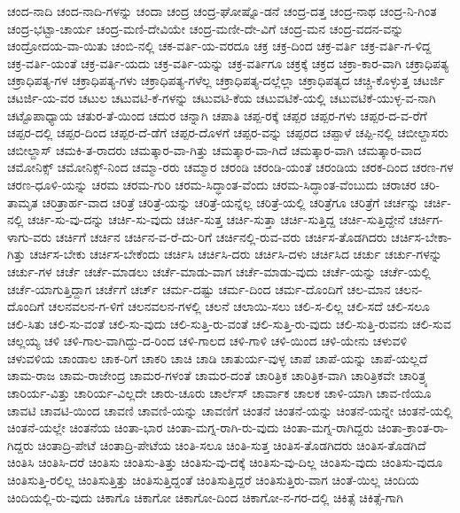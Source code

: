 {ಚಂದ-ನಾದಿ
ಚಂದ-ನಾದಿ-ಗಳನ್ನು
ಚಂದಾ
ಚಂದ್ರ
ಚಂದ್ರ-ಘೋಷ್ನೊ-ಡನೆ
ಚಂದ್ರ-ದತ್ತ
ಚಂದ್ರ-ನಾಥ
ಚಂದ್ರ-ನಿ-ಗಿಂತ
ಚಂದ್ರ-ಭಟ್ಟಾ-ಚಾರ್ಯ
ಚಂದ್ರ-ಮಣಿ-ದೇವಿಯೇ
ಚಂದ್ರ-ಮಣೀ-ದೇ-ವಿಗೆ
ಚಂದ್ರ-ಮನ
ಚಂದ್ರ-ವದನ-ವನ್ನು
ಚಂದ್ರೋದಯ-ವಾ-ಯಿತು
ಚಂಬಿ-ನಲ್ಲಿ
ಚಕ-ವರ್ತಿ-ಯ-ವರದೂ
ಚಕ್ರ
ಚಕ್ರ-ದಿಂದ
ಚಕ್ರ-ವರ್ತಿ
ಚಕ್ರ-ವರ್ತಿ-ಗ-ಳಿದ್ದ
ಚಕ್ರ-ವರ್ತಿ-ಯಂತೆ
ಚಕ್ರ-ವರ್ತಿ-ಯದು
ಚಕ್ರ-ವರ್ತಿ-ಯನ್ನು
ಚಕ್ರ-ವರ್ತಿಗೂ
ಚಕ್ರಕ್ಕೆ
ಚಕ್ರದ
ಚಕ್ರಾ-ಕಾರ-ವಾಗಿ
ಚಕ್ರಾಧಿಪತ್ಯ
ಚಕ್ರಾಧಿಪತ್ಯ-ಗಳ
ಚಕ್ರಾಧಿಪತ್ಯ-ಗಳು
ಚಕ್ರಾಧಿಪತ್ಯ-ಗಳೆಲ್ಲ
ಚಕ್ರಾಧಿಪತ್ಯ-ದಲ್ಲೆಲ್ಲಾ
ಚಕ್ರಾಧಿಪತ್ಯದ
ಚಚ್ಚಿ-ಕೊಳ್ಳುತ್ತ
ಚಟರ್ಜಿ
ಚಟರ್ಜಿ-ಯ-ವರ
ಚಟುಲ
ಚಟುವಟಿ-ಕೆ-ಗಳನ್ನು
ಚಟುವಟಿ-ಕೆಯ
ಚಟುವಟಿಕೆ-ಯಲ್ಲಿ
ಚಟುವಟಿಕೆ-ಯುಳ್ಳ-ವ-ನಾಗಿ
ಚಟ್ಟೊಪಾಧ್ಯಾಯ
ಚತುರ-ತೆ-ಯಿಂದ
ಚದುರ
ಚನ್ನಾಗಿ
ಚಪಾತಿ
ಚಪ್ಪ-ರಕ್ಕೆ
ಚಪ್ಪರ
ಚಪ್ಪರ-ಗಳು
ಚಪ್ಪರ-ದ-ವ-ರೆಗೆ
ಚಪ್ಪರ-ದಲ್ಲಿ
ಚಪ್ಪರ-ದಿಂದ
ಚಪ್ಪರ-ದೆ-ಡೆಗೆ
ಚಪ್ಪರ-ದೊಳಗೆ
ಚಪ್ಪರ-ವನ್ನು
ಚಪ್ಪರದ
ಚಪ್ಪಾಳೆ
ಚಪ್ಪಿ-ನಲ್ಲಿ
ಚಬೀಲ್ದಾಸರು
ಚಬೀಲ್ದಾಸ್
ಚಮಕಿ-ತ-ರಾದರು
ಚಮತ್ಕಾರ-ವಾ-ಗಿತ್ತು
ಚಮತ್ಕಾರ-ವಾ-ಗಿದೆ
ಚಮತ್ಕಾರ-ವಾಗಿ
ಚಮತ್ಕಾರ-ವಾದ
ಚಮೋನಿಕ್ಸ್
ಚಮೋನಿಕ್ಸ್-ನಿಂದ
ಚಮ್ಮಾ-ರರು
ಚಮ್ಮಾರ
ಚರಂಡಿ
ಚರಂಡಿ-ಯಂತೆ
ಚರಂಡಿಯ
ಚರಕ-ದಿಂದ
ಚರಣ-ಗಳ
ಚರಣ-ಧೂಳಿ-ಯನ್ನು
ಚರಮ
ಚರಮ-ಗುರಿ
ಚರಮ-ಸಿದ್ಧಾಂತ-ವೆಂದು
ಚರಮ-ಸಿದ್ಧಾಂತ-ವೆಂಬುದು
ಚರಾಚರ
ಚರಿ-ತಾಮೃತ
ಚರಿತ್ರಾರ್ಹ-ವಾದ
ಚರಿತ್ರೆ
ಚರಿತ್ರೆ-ಯನ್ನು
ಚರಿತ್ರೆ-ಯನ್ನೆಲ್ಲ
ಚರಿತ್ರೆ-ಯಲ್ಲಿ
ಚರಿತ್ರೆಗೂ
ಚರಿತ್ರೆಗೆ
ಚರ್ಚನ್ನು
ಚರ್ಚಿ-ನಲ್ಲಿ
ಚರ್ಚಿ-ಸು-ವು-ದನ್ನು
ಚರ್ಚಿ-ಸು-ವುದು
ಚರ್ಚಿ-ಸುತ್ತ
ಚರ್ಚಿ-ಸುತ್ತಾ
ಚರ್ಚಿ-ಸುತ್ತಿದ್ದ
ಚರ್ಚಿ-ಸುತ್ತಿದ್ದೇನೆ
ಚರ್ಚಿಗ-ಳಾಗು-ವರು
ಚರ್ಚಿಗೆ
ಚರ್ಚಿನ
ಚರ್ಚಿನ-ವ-ರೆ-ದು-ರಿಗೆ
ಚರ್ಚಿನಲ್ಲಿ-ರುವ-ವರು
ಚರ್ಚಿಸ-ತೊಡಗಿದರು
ಚರ್ಚಿಸ-ಬೇಕಾ-ಗಿತ್ತು
ಚರ್ಚಿಸ-ಬೇಕು
ಚರ್ಚಿಸ-ಬೇಕೆಂದು
ಚರ್ಚಿಸಿ
ಚರ್ಚಿಸಿ-ದರು
ಚರ್ಚಿಸಿ-ದಳು
ಚರ್ಚಿಸಿದ
ಚರ್ಚು
ಚರ್ಚು-ಗಳನ್ನು
ಚರ್ಚು-ಗಳ
ಚರ್ಚೆ
ಚರ್ಚೆ-ಮಾಡಲು
ಚರ್ಚೆ-ಮಾಡು-ವಾಗ
ಚರ್ಚೆ-ಮಾಡು-ವುದು
ಚರ್ಚೆ-ಯನ್ನು
ಚರ್ಚೆ-ಯಲ್ಲಿ
ಚರ್ಚೆ-ಯಾಗುತ್ತಿದ್ದಾಗ
ಚರ್ಚೆಗೆ
ಚರ್ಚ್
ಚರ್ಮ-ದಷ್ಟು
ಚರ್ಮ-ದಿಂದ
ಚರ್ಮ-ದೊಂದಿಗೆ
ಚಲ-ಮಾನ
ಚಲನ-ದೊಂದಿಗೆ
ಚಲನವಲನ-ಗ-ಳಿಗೆ
ಚಲನವಲನ-ಗಳಲ್ಲಿ
ಚಲನೆ
ಚಲಾಯಿ-ಸಲು
ಚಲಿ-ಸ-ಲಿಲ್ಲ
ಚಲಿ-ಸದೆ
ಚಲಿ-ಸಲೂ
ಚಲಿ-ಸಿತು
ಚಲಿ-ಸು-ವಂತೆ
ಚಲಿ-ಸು-ವುದು
ಚಲಿ-ಸುತ್ತಿ-ರು-ವಂತೆ
ಚಲಿ-ಸುತ್ತಿ-ರು-ವುದು
ಚಲಿ-ಸುತ್ತಿ-ರುವನು
ಚಲಿ-ಸುವ
ಚಲ್ಲಯ್ಯ
ಚಳಿ
ಚಳಿ-ಗಾಲ-ವಾಗಿದ್ದು-ದ-ರಿಂದ
ಚಳಿ-ಗಾಲದ
ಚಳಿ-ಗಾಳಿ
ಚಳಿ-ಯಿಂದ
ಚಳಿ-ಯೇನು
ಚಳುವಳಿ
ಚಳುವಳಿಯ
ಚಾಂಡಾಲ
ಚಾಕ-ರಿಗೆ
ಚಾಕರಿ
ಚಾಚಿ
ಚಾಡಿ
ಚಾತುರ್ಯ-ವುಳ್ಳ
ಚಾಪೆ
ಚಾಪೆ-ಯನ್ನು
ಚಾಪೆ-ಯಲ್ಲದೆ
ಚಾಮ-ರಾಜ
ಚಾಮ-ರಾಜೇಂದ್ರ
ಚಾಮರ-ಗಳಂತೆ
ಚಾಮರ-ದಂತೆ
ಚಾರಿತ್ರಿಕ
ಚಾರಿತ್ರಿಕ-ವಾಗಿ
ಚಾರಿತ್ರಿಕವೇ
ಚಾರಿತ್ರ್ಯ
ಚಾರಿರ್ಯ-ವಿತ್ತು
ಚಾರಿರ್ಯ-ವಿಲ್ಲದೇ
ಚಾರು-ಚೂರು
ಚಾರ್ಲೆಸ್
ಚಾರ್ವಾಕ
ಚಾಲಕ
ಚಾಳಿ-ಯಾಗಿ
ಚಾವ-ಣಿಯೂ
ಚಾವಟಿ
ಚಾವಟಿ-ಯಿಂದ
ಚಾವಣಿ
ಚಾವಣಿ-ಯನ್ನು
ಚಾವಣಿಗೆ
ಚಿಂತನೆ
ಚಿಂತನೆ-ಯನ್ನು
ಚಿಂತನೆ-ಯನ್ನೇ
ಚಿಂತನೆ-ಯಲ್ಲಿ
ಚಿಂತನೆ-ಯಲ್ಲೇ
ಚಿಂತನೆಯ
ಚಿಂತಾ-ಭಾರ
ಚಿಂತಾ-ಮಗ್ನ-ರಾಗಿ-ರು-ವುದು
ಚಿಂತಾ-ಮಗ್ನ-ರಾಗಿದ್ದರು
ಚಿಂತಾ-ಕ್ರಾಂತ-ರಾ-ಗಿದ್ದರು
ಚಿಂತಾದ್ರಿ-ಪೇಟೆ
ಚಿಂತಾದ್ರಿ-ಪೇಟೆಯ
ಚಿಂತಿ-ಸಲೂ
ಚಿಂತಿ-ಸುತ್ತ
ಚಿಂತಿಸ-ತೊಡಗಿದರು
ಚಿಂತಿಸ-ತೊಡಗಿದೆ
ಚಿಂತಿಸಿ
ಚಿಂತಿಸಿ-ದರೆ
ಚಿಂತಿಸು
ಚಿಂತಿಸು-ತಿತ್ತು
ಚಿಂತಿಸು-ವು-ದಕ್ಕೆ
ಚಿಂತಿಸು-ವು-ದಿಲ್ಲ
ಚಿಂತಿಸು-ವುದು
ಚಿಂತಿಸು-ವುದೂ
ಚಿಂತಿಸುತ್ತಿ-ರಲಿಲ್ಲ
ಚಿಂತಿಸುತ್ತಿತ್ತು
ಚಿಂತಿಸುತ್ತಿದ್ದಂತೆ
ಚಿಂತಿಸುತ್ತಿದ್ದರೆ
ಚಿಂತಿಸುತ್ತಿರು-ವಾಗ
ಚಿಂತೆ-ಯಿಲ್ಲ
ಚಿಂದಿಯ
ಚಿಂದಿಯಲ್ಲಿ-ರು-ವುದು
ಚಿಕಾಗೊ
ಚಿಕಾಗೋ
ಚಿಕಾಗೋ-ದಿಂದ
ಚಿಕಾಗೋ-ನ-ಗರ-ದಲ್ಲಿ
ಚಿಕಿತ್ಸೆ
ಚಿಕಿತ್ಸೆ-ಗಾಗಿ
}
